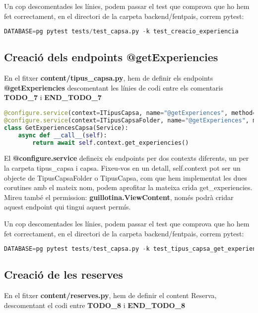 \documentclass[a4paper, 11pt]{article}
\begin{document}
Un cop descomentades les línies, podem passar el test que comprova
  que ho hem fet correctament, en el directori de la carpeta
  backend/fentpais, correm pytest:
  \begin{lstlisting}[language=Python, caption=Testing 3]
    DATABASE=pg pytest tests/test_capsa.py -k test_creacio_experiencia
  \end{lstlisting}

\subsection{Creació dels endpoints @getExperiencies}
En el fitxer \textbf{content/tipus\_capsa.py}, hem de definir els
endpoints \textbf{@getExperiencies} descomentant les línies de codi
entre els comentaris \textbf{TODO\_7} i \textbf{END\_TODO\_7}

\begin{lstlisting}[language=Python, caption=Definició endpoints]
@configure.service(context=ITipusCapsa, name="@getExperiences", method="GET", permission="guillotina.ViewContent")
@configure.service(context=ITipusCapsaFolder, name="@getExperiences", method="GET", permission="guillotina.ViewContent")
class GetExperiencesCapsa(Service):
    async def __call__(self):
        return await self.context.get_experiencies()
\end{lstlisting}
      
El \textbf{@configure.service} defineix els endpoints per dos contexts
diferents, un per la carpeta tipus\_capsa i capsa. Fixeu-vos en un
detall, self.context pot ser un objecte de TipusCapsaFolder o
TipusCapsa, com que hem implementat les dues corutines amb el mateix
nom, podem aprofitar la mateixa crida get\_experiencies. Mireu també
el permission: \textbf{guillotina.ViewContent}, només podrà cridar aquest
endpoint qui tingui aquest permís.
      
      
Un cop descomentades les línies, podem passar el test que comprova
  que ho hem fet correctament, en el directori de la carpeta
  backend/fentpais, correm pytest:
\begin{lstlisting}[language=Python, caption=Testing 4]
  DATABASE=pg pytest tests/test_capsa.py -k test_tipus_capsa_get_experiencies_endpoint
\end{lstlisting}

\subsection{Creació de les reserves}
En el fitxer \textbf{content/reserves.py}, hem de definir el content Reserva, descomentant el codi entre
\textbf{TODO\_8} i \textbf{END\_TODO\_8}
\end{document}
